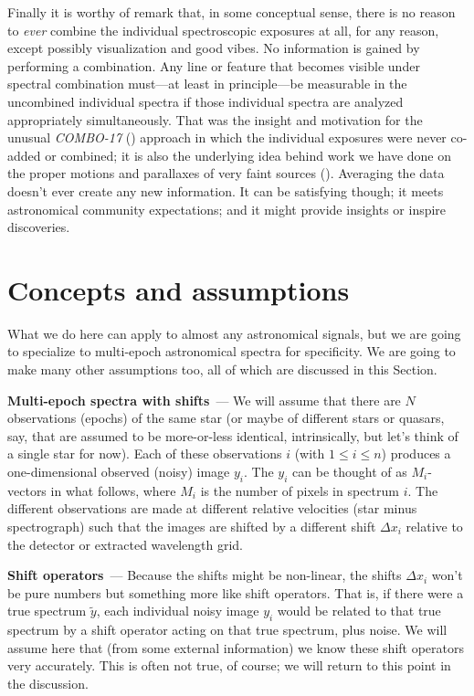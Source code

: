 \documentclass[modern]{aastex631}
\renewcommand{\paragraph}[1]{\medskip\par\noindent\textbf{#1}~---}
\newcommand{\sectionname}{Section}
\begin{document}
Finally it is worthy of remark that, in some conceptual sense, there is no reason to \emph{ever} combine the individual spectroscopic exposures at all, for any reason, except possibly visualization and good vibes.
No information is gained by performing a combination.
Any line or feature that becomes visible under spectral combination must---at least in principle---be measurable in the uncombined individual spectra if those individual spectra are analyzed appropriately simultaneously.
That was the insight and motivation for the unusual \textsl{COMBO-17} (\citealt{combo17}) approach in which the individual exposures were never co-added or combined; it is also the underlying idea behind work we have done on the proper motions and parallaxes of very faint sources (\citealt{undetectable}).
Averaging the data doesn't ever create any new information.
It can be satisfying though; it meets astronomical community expectations; and it might provide insights or inspire discoveries.

\section{Concepts and assumptions}\label{sec:assumptions}

What we do here can apply to almost any astronomical signals, but we are going to specialize to multi-epoch astronomical spectra for specificity.
We are going to make many other assumptions too, all of which are discussed in this \sectionname.

\paragraph{Multi-epoch spectra with shifts}
We will assume that there are $N$ observations (epochs) of the same star (or maybe of different stars or quasars, say, that are assumed to be more-or-less identical, intrinsically, but let's think of a single star for now).
Each of these observations $i$ (with $1\leq i\leq n$) produces a one-dimensional observed (noisy) image $y_i$.
The $y_i$ can be thought of as $M_i$-vectors in what follows, where $M_i$ is the number of pixels in spectrum $i$.
The different observations are made at different relative velocities (star minus spectrograph) such that the images are shifted by a different shift $\Delta x_i$ relative to the detector or extracted wavelength grid.

\paragraph{Shift operators}
Because the shifts might be non-linear, the shifts $\Delta x_i$ won't be pure numbers but something more like shift operators.
That is, if there were a true spectrum $\tilde{y}$, each individual noisy image $y_i$ would be related to that true spectrum by a shift operator acting on that true spectrum, plus noise.
We will assume here that (from some external information) we know these shift operators very accurately.
This is often not true, of course; we will return to this point in the discussion.
\end{document}
